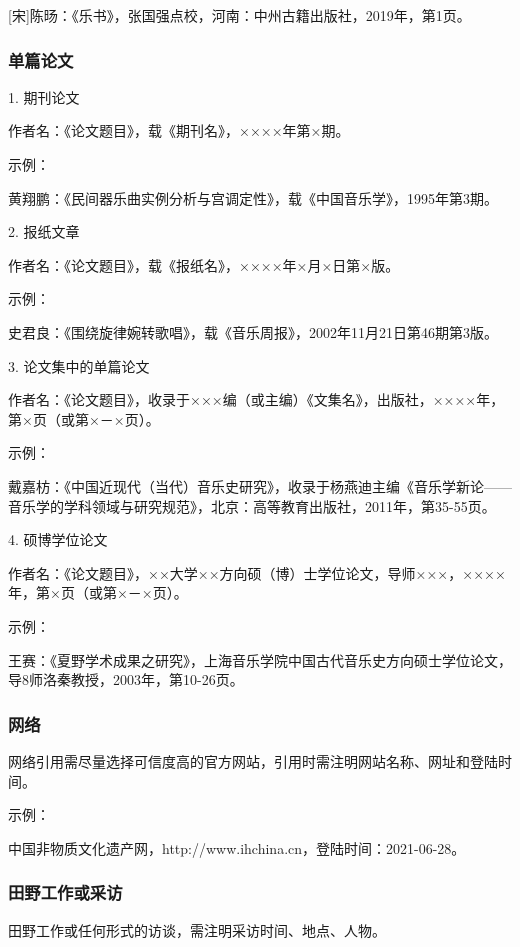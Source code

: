 [宋]陈旸：《乐书》，张国强点校，河南：中州古籍出版社，2019年，第1页。

\subsubsection{单篇论文}

1. 期刊论文

作者名：《论文题目》，载《期刊名》，××××年第×期。

示例：

黄翔鹏：《民间器乐曲实例分析与宫调定性》，载《中国音乐学》，1995年第3期。

2. 报纸文章

作者名：《论文题目》，载《报纸名》，××××年×月×日第×版。

示例：

史君良：《围绕旋律婉转歌唱》，载《音乐周报》，2002年11月21日第46期第3版。

3. 论文集中的单篇论文

作者名：《论文题目》，收录于×××编（或主编）《文集名》，出版社，××××年，第×页（或第×－×页）。

示例：

戴嘉枋：《中国近现代（当代）音乐史研究》，收录于杨燕迪主编《音乐学新论——音乐学的学科领域与研究规范》，北京：高等教育出版社，2011年，第35-55页。

4. 硕博学位论文

作者名：《论文题目》，××大学××方向硕（博）士学位论文，导师×××，××××年，第×页（或第×－×页）。

示例：

王赛：《夏野学术成果之研究》，上海音乐学院中国古代音乐史方向硕士学位论文，导8师洛秦教授，2003年，第10-26页。

\subsubsection{网络}

网络引用需尽量选择可信度高的官方网站，引用时需注明网站名称、网址和登陆时间。

示例：

中国非物质文化遗产网，http://www.ihchina.cn，登陆时间：2021-06-28。

\subsubsection{田野工作或采访}

田野工作或任何形式的访谈，需注明采访时间、地点、人物。

